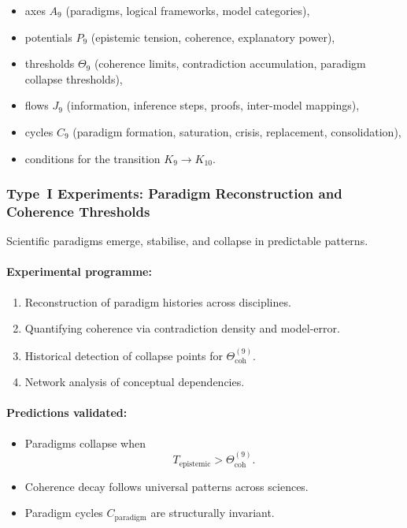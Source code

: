 \begin{itemize}
    \item axes $A_9$ (paradigms, logical frameworks, model categories),
    \item potentials $P_9$ (epistemic tension, coherence, explanatory power),
    \item thresholds $\Theta_9$ (coherence limits, contradiction accumulation,
          paradigm collapse thresholds),
    \item flows $J_9$ (information, inference steps, proofs, 
          inter-model mappings),
    \item cycles $C_9$ (paradigm formation, saturation, crisis, 
          replacement, consolidation),
    \item conditions for the transition $K_9 \to K_{10}$.
\end{itemize}



\subsubsection{Type~I Experiments: Paradigm Reconstruction and Coherence Thresholds}

Scientific paradigms emerge, stabilise, and collapse in 
predictable patterns.

\paragraph{Experimental programme:}

\begin{enumerate}
    \item Reconstruction of paradigm histories across disciplines.
    \item Quantifying coherence via contradiction density and model-error.
    \item Historical detection of collapse points for 
          $\Theta_{\mathrm{coh}}^{(9)}$.
    \item Network analysis of conceptual dependencies.
\end{enumerate}

\paragraph{Predictions validated:}

\begin{itemize}
    \item Paradigms collapse when 
          \[
              T_{\mathrm{epistemic}} > \Theta_{\mathrm{coh}}^{(9)}.
          \]
    \item Coherence decay follows universal patterns across sciences.
    \item Paradigm cycles $C_{\mathrm{paradigm}}$ are structurally invariant.
\end{itemize}



